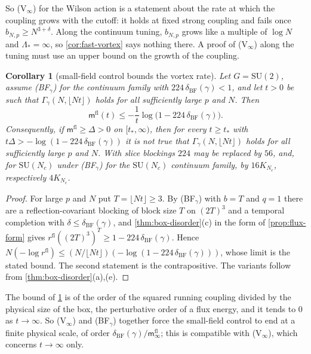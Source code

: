 \documentclass[11pt,a4paper]{amsart}
\newtheorem{corollary}[theorem]{Corollary}
\theoremstyle{definition}
\theoremstyle{remark}
\numberwithin{equation}{section}
\newcommand{\SU}{\mathrm{SU}}              %
\newcommand{\cube}[1]{(2#1)^3}             %
\begin{document}
So \textup{(V$_\infty$)} for the Wilson action is a statement about the rate at which the coupling grows with the cutoff: it holds at fixed strong coupling and fails once $b_{N,p}\ge N^{3+\delta}$. Along the continuum tuning, $b_{N,p}$ grows like a multiple of $\log N$ and $\Lambda_*=\infty$, so \cref{cor:fast-vortex} says nothing there. A proof of \textup{(V$_\infty$)} along the tuning must use an upper bound on the growth of the coupling.

\begin{corollary}[small-field control bounds the vortex rate]\label{cor:BF-vortex}
Let $G=\SU(2)$, assume \textup{(BF$_\gamma$)} for the continuum family with $224\,\delta_{\mathrm{BF}}(\gamma)<1$, and let $t>0$ be such that $\Gamma_\gamma(N,\lfloor Nt\rfloor)$ holds for all sufficiently large $p$ and $N$. Then
\[
\mathsf m^{\mathrm{fl}}(t)\le-\frac1t\log\bigl(1-224\,\delta_{\mathrm{BF}}(\gamma)\bigr).
\]
Consequently, if $\mathsf m^{\mathrm{fl}}\ge\Delta>0$ on $[t_*,\infty)$, then for every $t\ge t_*$ with $t\Delta>-\log(1-224\,\delta_{\mathrm{BF}}(\gamma))$ it is not true that $\Gamma_\gamma(N,\lfloor Nt\rfloor)$ holds for all sufficiently large $p$ and $N$. With slice blockings $224$ may be replaced by $56$, and, for $\SU(N_c)$ under \textup{(BF$_\gamma$)} for the $\SU(N_c)$ continuum family, by $16K_{N_c}$, respectively $4K_{N_c}$.
\end{corollary}

\begin{proof}
For large $p$ and $N$ put $T=\lfloor Nt\rfloor\ge3$. By \textup{(BF$_\gamma$)} with $b=T$ and $q=1$ there are a reflection-covariant blocking of block size $T$ on $\cube T$ and a temporal completion with $\delta\le\delta_{\mathrm{BF}}(\gamma)$, and \cref{thm:box-disorder}\textup{(c)} in the form of \cref{prop:flux-form} gives $r^{\mathrm{fl}}(\cube T)^T\ge1-224\,\delta_{\mathrm{BF}}(\gamma)$. Hence $N(-\log r^{\mathrm{fl}})\le(N/\lfloor Nt\rfloor)(-\log(1-224\,\delta_{\mathrm{BF}}(\gamma)))$, whose limit is the stated bound. The second statement is the contrapositive. The variants follow from \cref{thm:box-disorder}\textup{(a),(e)}.
\end{proof}

The bound of \cref{cor:BF-vortex} is of the order of the squared running coupling divided by the physical size of the box, the perturbative order of a flux energy, and it tends to $0$ as $t\to\infty$. So \textup{(V$_\infty$)} and \textup{(BF$_\gamma$)} together force the small-field control to end at a finite physical scale, of order $\delta_{\mathrm{BF}}(\gamma)/\mathsf m^{\mathrm{fl}}_\infty$; this is compatible with \textup{(V$_\infty$)}, which concerns $t\to\infty$ only.
\end{document}
